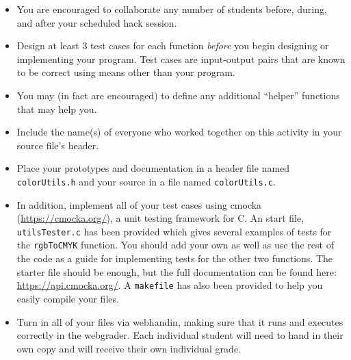 \documentclass[12pt]{scrartcl}
\begin{document}
\begin{itemize}
  \item You are encouraged to collaborate any number of students 
  before, during, and after your scheduled hack session.  
  \item Design at least 3 test cases for each function
  \emph{before} you begin
  designing or implementing your program.  Test cases are 
  input-output pairs that are known to be correct using means
  other than your program.
  \item You may (in fact are encouraged) to define any additional
  ``helper'' functions that may help you.
  \item Include the name(s) of everyone who worked together on
  this activity in your source file's header.
  \item Place your prototypes and documentation in a header file 
  named \texttt{colorUtils.h} and your source in a file
  named \texttt{colorUtils.c}.
  \item In addition, implement all of your test cases using 
  cmocka (\url{https://cmocka.org/}), a unit testing framework 
  for C.  An start file, 
  \texttt{utilsTester.c} has been provided which
  gives several examples of tests for the \texttt{rgbToCMYK}
  function.  You should add your own as well as use the 
  rest of the code as a guide for implementing tests for the
  other two functions.  The starter file should be enough, but
  the full documentation can be found here: \url{https://api.cmocka.org/}.
  A \texttt{makefile} has also been provided to help
  you easily compile your files.  
  \item Turn in all of your files via webhandin, making sure that 
  it runs and executes correctly in the webgrader.  Each individual 
  student will need to hand in their own copy and will receive 
  their own individual grade.
\end{itemize}  
\end{document}
